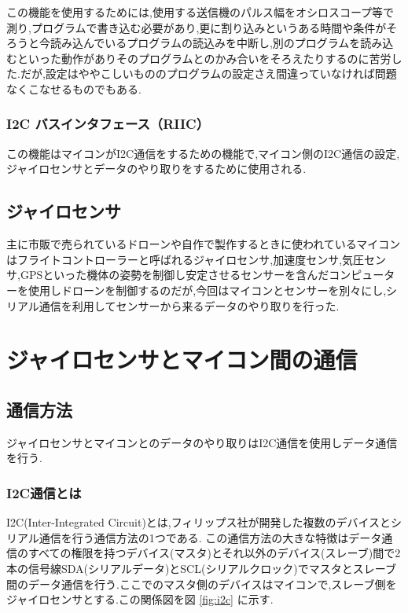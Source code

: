 \documentclass[12pt,oneside]{paper}
\begin{document}
この機能を使用するためには,使用する送信機のパルス幅をオシロスコープ等で測り,プログラムで書き込む必要があり,更に割り込みというある時間や条件がそろうと今読み込んでいるプログラムの読込みを中断し,別のプログラムを読み込むといった動作がありそのプログラムとのかみ合いをそろえたりするのに苦労した.だが,設定はややこしいもののプログラムの設定さえ間違っていなければ問題なくこなせるものでもある.

\subsection{I2C バスインタフェース（RIIC）}この機能はマイコンがI2C通信をするための機能で,マイコン側のI2C通信の設定,ジャイロセンサとデータのやり取りをするために使用される.

\section{ジャイロセンサ}主に市販で売られているドローンや自作で製作するときに使われているマイコンはフライトコントローラーと呼ばれるジャイロセンサ,加速度センサ,気圧センサ,GPSといった機体の姿勢を制御し安定させるセンサーを含んだコンピューターを使用しドローンを制御するのだが,今回はマイコンとセンサーを別々にし,シリアル通信を利用してセンサーから来るデータのやり取りを行った.


\chapter{ジャイロセンサとマイコン間の通信}

\section{通信方法}ジャイロセンサとマイコンとのデータのやり取りはI2C通信を使用しデータ通信を行う.
 

\subsection{I2C通信とは}I2C(Inter-Integrated Circuit)とは,フィリップス社が開発した複数のデバイスとシリアル通信を行う通信方法の1つである.
この通信方法の大きな特徴はデータ通信のすべての権限を持つデバイス(マスタ)とそれ以外のデバイス(スレーブ)間で2本の信号線SDA(シリアルデータ)とSCL(シリアルクロック)でマスタとスレーブ間のデータ通信を行う.ここでのマスタ側のデバイスはマイコンで,スレーブ側をジャイロセンサとする.この関係図を図 \ref{fig:i2c} に示す.
\end{document}
